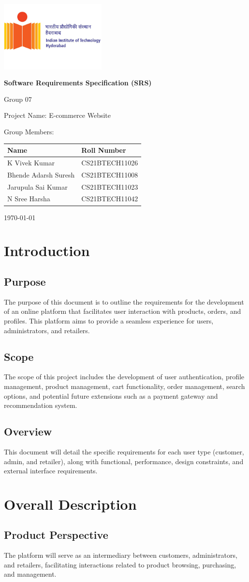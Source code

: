 \documentclass{article}
\title{} %
\author{} %
\date{} %
\renewcommand{\maketitle}{
    \begin{titlepage}
        \centering
        \includegraphics[width=0.4\textwidth]{iith_logo.png} 
        \vspace{2cm} %
        
        {\color{titlecolor}\Huge\bfseries Software Requirements Specification (SRS)\par}
        \vspace{1.5cm} %
          {\color{black}\large Group 07\par}
        {\color{subtitlecolor}\Large Project Name: E-commerce Website\par}
        \vspace{0.5cm} %
        

        {\fontsize{14}{18}\selectfont Group Members:\par}
        \vspace{0.2cm} %
       
{\large
\begin{center}
\begingroup
\setlength{\tabcolsep}{15pt} %
\renewcommand{\arraystretch}{2} %
\begin{tabular}{|l|l|}
\hline
\textbf{Name} & \textbf{ Roll Number} \\
\hline
K Vivek Kumar & CS21BTECH11026 \\
\hline
Bhende Adarsh Suresh & CS21BTECH11008 \\
\hline
Jarupula Sai Kumar & CS21BTECH11023 \\
\hline
N Sree Harsha & CS21BTECH11042 \\
\hline
\end{tabular}
\endgroup
\end{center}
}


        \vspace{0.5cm} %

       
        \vfill
        
        {\large\today\par}
        \vspace{1cm} %
    \end{titlepage}
}
\begin{document}
\maketitle
\tableofcontents
\newpage
\section{Introduction}
\subsection{Purpose}
The purpose of this document is to outline the requirements for the development of an online platform that facilitates user interaction with products, orders, and profiles. This platform aims to provide a seamless experience for users, administrators, and retailers.

\subsection{Scope}
The scope of this project includes the development of user authentication, profile management, product management, cart functionality, order management, search options, and potential future extensions such as a payment gateway and recommendation system.

\subsection{Overview}
This document will detail the specific requirements for each user type (customer, admin, and retailer), along with functional, performance, design constraints, and external interface requirements.

\section{Overall Description}
\subsection{Product Perspective}
The platform will serve as an intermediary between customers, administrators, and retailers, facilitating interactions related to product browsing, purchasing, and management.
\end{document}
